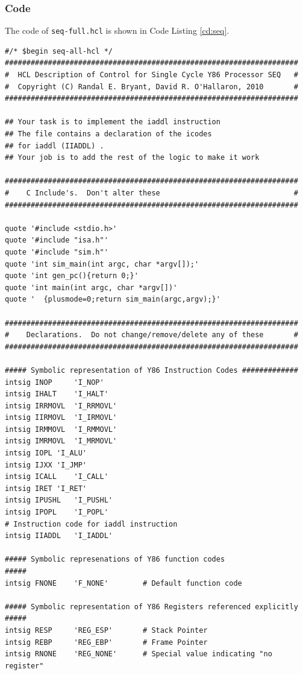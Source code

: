 \documentclass{article}
\begin{document}
\subsubsection{Code}

The code of \verb|seq-full.hcl| is shown in Code Listing \ref{cd:seq}.

\begin{lstlisting}[caption={seq-full.hcl}, label={cd:seq}]
#/* $begin seq-all-hcl */
####################################################################
#  HCL Description of Control for Single Cycle Y86 Processor SEQ   #
#  Copyright (C) Randal E. Bryant, David R. O'Hallaron, 2010       #
####################################################################

## Your task is to implement the iaddl instruction
## The file contains a declaration of the icodes
## for iaddl (IIADDL) .
## Your job is to add the rest of the logic to make it work

####################################################################
#    C Include's.  Don't alter these                               #
####################################################################

quote '#include <stdio.h>'
quote '#include "isa.h"'
quote '#include "sim.h"'
quote 'int sim_main(int argc, char *argv[]);'
quote 'int gen_pc(){return 0;}'
quote 'int main(int argc, char *argv[])'
quote '  {plusmode=0;return sim_main(argc,argv);}'

####################################################################
#    Declarations.  Do not change/remove/delete any of these       #
####################################################################

##### Symbolic representation of Y86 Instruction Codes #############
intsig INOP 	'I_NOP'
intsig IHALT	'I_HALT'
intsig IRRMOVL	'I_RRMOVL'
intsig IIRMOVL	'I_IRMOVL'
intsig IRMMOVL	'I_RMMOVL'
intsig IMRMOVL	'I_MRMOVL'
intsig IOPL	'I_ALU'
intsig IJXX	'I_JMP'
intsig ICALL	'I_CALL'
intsig IRET	'I_RET'
intsig IPUSHL	'I_PUSHL'
intsig IPOPL	'I_POPL'
# Instruction code for iaddl instruction
intsig IIADDL	'I_IADDL'

##### Symbolic represenations of Y86 function codes                  #####
intsig FNONE    'F_NONE'        # Default function code

##### Symbolic representation of Y86 Registers referenced explicitly #####
intsig RESP     'REG_ESP'    	# Stack Pointer
intsig REBP     'REG_EBP'    	# Frame Pointer
intsig RNONE    'REG_NONE'   	# Special value indicating "no register"


\end{lstlisting}
\end{document}
